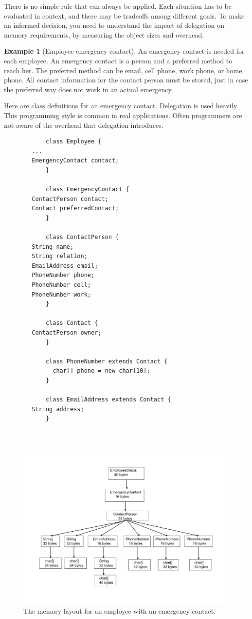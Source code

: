 \documentclass{book}
\theoremstyle{definition}
\newtheorem{example}{Example}
\begin{document}
There is no simple rule that can always be applied. Each situation has to be evaluated in context, and there may be tradeoffs among different goals. To make an informed decision, you need to understand the impact of delegation on memory requirements, by measuring the object sizes and overhead.  

 
\begin{example}[Employee emergency contact] 
An emergency contact is needed for each employee. An emergency contact is a person and a preferred method to reach her.  The preferred method can be email, cell phone, work phone, or home phone. All contact information for the contact person must be stored, just in case the preferred way does not work in an actual emergency. 
\end{example}
Here are class definitions for an emergency contact. Delegation is used heavily. This programming style is common in real applications. Often programmers are not aware of the overhead that delegation introduces. 

\ttfamily
\begin{verbatim} 
			class Employee {
        ...
        EmergencyContact contact;
			}
			
			class EmergencyContact {
        ContactPerson contact;
        Contact preferredContact;
			}
			
			class ContactPerson {
        String name;
        String relation;
        EmailAddress email;
        PhoneNumber phone;
        PhoneNumber cell;
        PhoneNumber work;
			}
			
			class Contact {
        ContactPerson owner;
			}
			
			class PhoneNumber extends Contact {
			  char[] phone = new char[10];
			}
			
			class EmailAddress extends Contact {
        String address;
			}
			
			
\end{verbatim}
\normalfont
 \begin{figure}
  \centering
 \includegraphics[width=.70\textwidth]{Figures/chapter4/employee-status-fine-grained.pdf}
  \caption{The memory layout for an employee with an emergency contact.}
  \label{fig:employee-status-fine-grained}
\end{figure}
\end{document}
